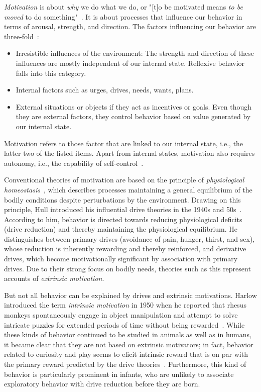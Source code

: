 \documentclass[a4paper]{scrreprt}
\begin{document}
\textit{Motivation} is about \textit{why} we do what we do, or "[t]o be motivated means \textit{to be moved} to do something"~\cite{ryan00b}. It is about processes that influence our behavior in terms of arousal, strength, and direction. The factors influencing our behavior are three-fold~\cite{cofer64}:
\begin{itemize}
\item Irresistible influences of the environment: The strength and direction of these influences are mostly independent of our internal state. Reflexive behavior falls into this category.
\item Internal factors such as urges, drives, needs, wants, plans.
\item External situations or objects if they act as incentives or goals. Even though they are external factors, they control behavior based on value generated by our internal state.
\end{itemize}
Motivation refers to those factor that are linked to our internal state, i.e., the latter two of the listed items. Apart from internal states, motivation also requires autonomy, i.e., the capability of self-control~\cite{mcfarland93}.

Conventional theories of motivation are based on the principle of \textit{physiological homeostasis}~\cite{cannon32}, which describes processes maintaining a general equilibrium of the bodily conditions despite perturbations by the environment. Drawing on this principle, Hull introduced his influential drive theories in the 1940s and 50s~\cite{hull43,hull51,hull52}. According to him, behavior is directed towards reducing physiological deficits (drive reduction) and thereby maintaining the physiological equilibrium. He distinguishes between primary drives (avoidance of pain, hunger, thirst, and sex), whose reduction is inherently rewarding and thereby reinforced, and derivative drives, which become motivationally significant by association with primary drives. Due to their strong focus on bodily needs, theories such as this represent accounts of \textit{extrinsic motivation}.

But not all behavior can be explained by drives and extrinsic motivations. Harlow introduced the term \textit{intrinsic motivation} in 1950 when he reported that rhesus monkeys spontaneously engage in object manipulation and attempt to solve intricate puzzles for extended periods of time without being rewarded~\cite{harlow50}. While these kinds of behavior continued to be studied in animals as well as in humans, it became clear that they are not based on extrinsic motivators; in fact, behavior related to curiosity and play seems to elicit intrinsic reward that is on par with the primary reward predicted by the drive theories~\cite{white59,berlyne66}. Furthermore, this kind of behavior is particularly prominent in infants, who are unlikely to associate exploratory behavior with drive reduction before they are born.
\end{document}
